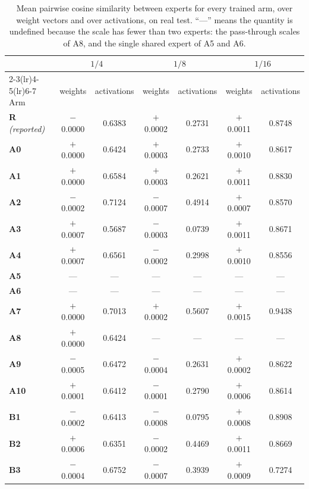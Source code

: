 \documentclass[10pt,a4paper,twocolumn,twoside]{article}
\begin{document}
\begin{table}[!t]
\centering
\caption{Mean pairwise cosine similarity between experts for every trained arm, over
weight vectors and over activations, on real test. ``---'' means the quantity is
undefined because the scale has fewer than two experts: the pass-through scales of A8,
and the single shared expert of A5 and A6.}
\label{tab:simall}
\scriptsize
\setlength{\tabcolsep}{2.6pt}
\begin{tabular}{@{}lcccccc@{}}
\toprule
& \multicolumn{2}{c}{$1/4$} & \multicolumn{2}{c}{$1/8$} & \multicolumn{2}{c}{$1/16$} \\
\cmidrule(lr){2-3}\cmidrule(lr){4-5}\cmidrule(lr){6-7}
Arm & weights & activations & weights & activations & weights & activations \\
\midrule
\textbf{R} \textit{(reported)} & $-$0.0000 & 0.6383 & $+$0.0002 & 0.2731 & $+$0.0011 & 0.8748 \\
\textbf{A0} & $+$0.0000 & 0.6424 & $+$0.0003 & 0.2733 & $+$0.0010 & 0.8617 \\
\textbf{A1} & $+$0.0000 & 0.6584 & $+$0.0003 & 0.2621 & $+$0.0011 & 0.8830 \\
\textbf{A2} & $-$0.0002 & 0.7124 & $-$0.0007 & 0.4914 & $+$0.0007 & 0.8570 \\
\textbf{A3} & $+$0.0007 & 0.5687 & $-$0.0003 & 0.0739 & $+$0.0011 & 0.8671 \\
\textbf{A4} & $+$0.0007 & 0.6561 & $-$0.0002 & 0.2998 & $+$0.0010 & 0.8556 \\
\textbf{A5} & --- & --- & --- & --- & --- & --- \\
\textbf{A6} & --- & --- & --- & --- & --- & --- \\
\textbf{A7} & $+$0.0000 & 0.7013 & $+$0.0002 & 0.5607 & $+$0.0015 & 0.9438 \\
\textbf{A8} & $+$0.0000 & 0.6424 & --- & --- & --- & --- \\
\textbf{A9} & $-$0.0005 & 0.6472 & $-$0.0004 & 0.2631 & $+$0.0002 & 0.8622 \\
\textbf{A10} & $+$0.0001 & 0.6412 & $-$0.0001 & 0.2790 & $+$0.0006 & 0.8614 \\
\textbf{B1} & $-$0.0002 & 0.6413 & $-$0.0008 & 0.0795 & $+$0.0008 & 0.8908 \\
\textbf{B2} & $+$0.0006 & 0.6351 & $-$0.0002 & 0.4469 & $+$0.0011 & 0.8669 \\
\textbf{B3} & $-$0.0004 & 0.6752 & $-$0.0007 & 0.3939 & $+$0.0009 & 0.7274 \\
\bottomrule
\end{tabular}
\end{table}
\end{document}
